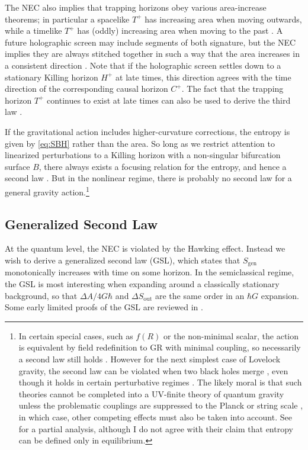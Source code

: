 \documentclass[12pt]{article}
\begin{document}
The NEC also implies that trapping horizons obey various area-increase theorems; in particular a spacelike $T^+$ has increasing area when moving outwards, while a timelike $T^+$ has (oddly) increasing area when moving to the past \cite{hayward1994general}.  A future holographic screen may include segments of both signature, but the NEC implies they are always stitched together in such a way that the area increases in a consistent direction \cite{bousso2015new}.  Note that if the holographic screen settles down to a stationary Killing horizon $H^+$ at late times, this direction agrees with the time direction of the corresponding causal horizon $C^+$. The fact that the trapping horizon $T^+$ continues to exist at late times can also be used to derive the third law \cite{israel}. 

If the gravitational action includes higher-curvature corrections, the entropy is given by \eqref{eq:SBH} rather than the area. So long as we restrict attention to linearized perturbations to a Killing horizon with a non-singular bifurcation surface $B$, there always exists a focusing relation for the entropy, and hence a second law \cite{Wall:2015raa, Sarkar:2013swa}.  But in the nonlinear regime, there is probably no second law for a general gravity action.\footnote{In certain special cases, such as $f(R)$ or the non-minimal scalar, the action is equivalent by field redefinition to GR with minimal coupling, so necessarily a second law still holds \cite{Jacobson:1995uq,ford2001classical}. However for the next simplest case of Lovelock gravity, the second law can be violated when two black holes merge \cite{Jacobson:1993xs,Liko:2007vi,Sarkar:2010xp}, even though it holds in certain perturbative regimes \cite{Wall:2015raa, Sarkar:2013swa,Kolekar:2012tq,Bhattacharyya:2016xfs}.  The likely moral is that such theories cannot be completed into a UV-finite theory of quantum gravity unless the problematic couplings are suppressed to the Planck or string scale \cite{camanho2016causality}, in which case, other competing effects must also be taken into account. See \cite{Chatterjee:2013daa} for a partial analysis, although I do not agree with their claim that entropy can be defined only in equilibrium.}

\subsection{Generalized Second Law}

At the quantum level, the NEC is violated by the Hawking effect.  Instead we wish to derive a generalized second law (GSL), which states that $S_{\mathrm{gen}}$ monotonically increases with time on some horizon.  In the semiclassical regime, the GSL is most interesting when expanding around a classically stationary background, so that $\Delta A/4G\hbar$ and $\Delta S_\mathrm{out}$ are the same order in an $\hbar G$ expansion.  Some early limited proofs of the GSL are reviewed in \cite{10proofs}.
\end{document}
